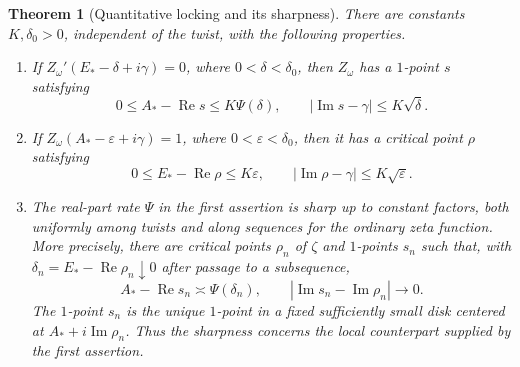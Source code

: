 \documentclass[11pt,letterpaper]{article}
\newtheorem{theorem}{Theorem}[section]
\theoremstyle{definition}
\theoremstyle{remark}
\newcommand{\eps}{\varepsilon}
\renewcommand{\Re}{\operatorname{Re}}
\renewcommand{\Im}{\operatorname{Im}}
\newcommand{\1}{\mathbf 1}
\begin{document}
\begin{theorem}[Quantitative locking and its sharpness]
\label{p02:eul:locking}
There are constants $K,\delta_0>0$, independent of the twist, with the
following properties.
\begin{enumerate}
\item If $Z_\omega'(E_*-\delta+i\gamma)=0$, where
$0<\delta<\delta_0$, then $Z_\omega$ has a $1$-point $s$ satisfying
\[
 0\le A_*-\Re s\le K\Psi(\delta),\qquad
 |\Im s-\gamma|\le K\sqrt\delta.
\]
\item If $Z_\omega(A_*-\eps+i\gamma)=1$, where
$0<\eps<\delta_0$, then it has a critical point $\rho$ satisfying
\[
 0\le E_*-\Re\rho\le K\eps,\qquad
 |\Im\rho-\gamma|\le K\sqrt\eps.
\]
\item The real-part rate $\Psi$ in the first assertion is sharp up
to constant factors, both uniformly among twists and along sequences
for the ordinary zeta function. More precisely, there are critical
points $\rho_n$ of $\zeta$ and $1$-points $s_n$ such that, with
$\delta_n=E_*-\Re\rho_n\downarrow0$ after passage to a subsequence,
\[
 A_*-\Re s_n\asymp\Psi(\delta_n),\qquad
 |\Im s_n-\Im\rho_n|\longrightarrow0.
\]
The $1$-point $s_n$ is the unique $1$-point in a fixed sufficiently
small disk centered at $A_*+i\Im\rho_n$. Thus the sharpness concerns
the local counterpart supplied by the first assertion.
\end{enumerate}
\end{theorem}
\end{document}
